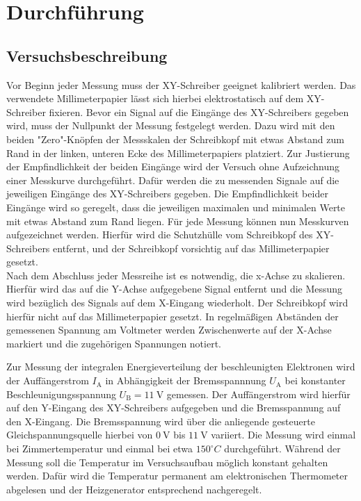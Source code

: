 \section{Durchführung}
\label{sec:Durchführung}



\subsection{Versuchsbeschreibung}
\label{sec:Versuchsbeschreibung}
Vor Beginn jeder Messung muss der XY-Schreiber geeignet kalibriert werden.
Das verwendete Millimeterpapier lässt sich hierbei elektrostatisch auf dem XY-Schreiber fixieren.
Bevor ein Signal auf die Eingänge des XY-Schreibers gegeben wird, muss der Nullpunkt der Messung festgelegt werden. Dazu wird mit den beiden "Zero"-Knöpfen der Messskalen der Schreibkopf mit etwas Abstand zum Rand in der linken, unteren Ecke des Millimeterpapiers platziert.
Zur Justierung der Empfindlichkeit der beiden Eingänge wird der Versuch ohne Aufzeichnung einer Messkurve durchgeführt. Dafür werden die zu messenden Signale auf die jeweiligen Eingänge des XY-Schreibers gegeben.
Die Empfindlichkeit beider Eingänge wird so geregelt, dass die jeweiligen maximalen und minimalen Werte mit etwas Abstand zum Rand liegen.
Für jede Messung können nun Messkurven aufgezeichnet werden. Hierfür wird die Schutzhülle vom Schreibkopf des XY-Schreibers entfernt, und der Schreibkopf vorsichtig auf das Millimeterpapier gesetzt.\\
Nach dem Abschluss jeder Messreihe ist es notwendig, die x-Achse zu skalieren. Hierfür wird das auf die Y-Achse aufgegebene Signal entfernt und die Messung wird bezüglich des Signals auf dem X-Eingang wiederholt. Der Schreibkopf wird hierfür nicht auf das Millimeterpapier gesetzt.
In regelmäßigen Abständen der gemessenen Spannung am Voltmeter werden Zwischenwerte auf der X-Achse markiert und die zugehörigen Spannungen notiert.

Zur Messung der integralen Energieverteilung der beschleunigten Elektronen wird der Auffängerstrom $I_\mathrm{A}$ in Abhängigkeit der Bremsspannnung $U_\mathrm{A}$ bei konstanter Beschleunigungsspannung $U_\mathrm{B}=\SI{11}{\volt}$ gemessen. Der Auffängerstrom wird hierfür auf den Y-Eingang des XY-Schreibers aufgegeben und die Bremsspannung auf den X-Eingang. Die Bremsspannung wird über die anliegende gesteuerte Gleichspannungsquelle hierbei von $\SI{0}{\volt}$ bis $\SI{11}{\volt}$ variiert.
Die Messung wird einmal bei Zimmertemperatur und einmal bei etwa $150^\circ C$ durchgeführt.
Während der Messung soll die Temperatur im Versuchsaufbau möglich konstant gehalten werden. Dafür wird die Temperatur permanent am elektronischen Thermometer abgelesen und der Heizgenerator entsprechend nachgeregelt.

